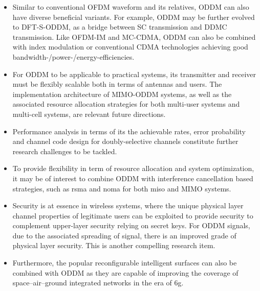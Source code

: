 \documentclass[journal]{IEEEtran}
\begin{document}
{\begin{itemize}
  \item Similar to conventional OFDM waveform and its relatives, ODDM can also have diverse beneficial variants. For example, ODDM may be further evolved to  DFT-S-ODDM, as a bridge between SC transmission and DDMC transmission. Like OFDM-IM\cite{ofdm-im} and MC-CDMA\cite{nathan_ieice_2002,yang_commag_2003}, ODDM can also be combined with index modulation or conventional CDMA technologies achieving good bandwidth-/power-/energy-efficiencies.

  \item For ODDM to be applicable to practical systems, its transmitter and receiver must be flexibly scalable both in terms of antennas and users. 
{The implementation architecture of MIMO-ODDM systems, as well as the associated resource allocation strategies for both multi-user systems and multi-cell systems, are relevant future directions.}

  \item Performance analysis in terms of its the achievable rates, error probability and channel code design for doubly-selective channels constitute further research challenges to be tackled.

  \item {To provide flexibility in term of resource allocation and system optimization, it may be of interest to combine ODDM with interference cancellation based strategies, such as \ac{rsma} \cite{rsma} and \ac{noma}\cite{noma} for both \ac{miso} and MIMO systems.}

  \item Security is at essence in wireless systems, where the unique physical layer channel properties of legitimate users can be exploited to provide security to complement upper-layer security relying on secret keys. For ODDM signals, due to the associated spreading of signal, there is an improved grade of physical layer security. This is another compelling research item.

  \item Furthermore, the popular %
  reconfigurable intelligent surfaces can also be combined with ODDM as they are capable of improving the coverage of space–air–ground integrated networks 
  in the era of \ac{6g}.




\end{itemize}}
\end{document}
